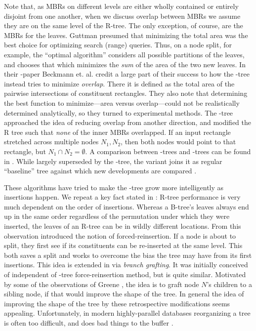 Note that, as MBRs on different levels are either wholly contained or entirely disjoint from one another, when we discuss overlap between MBRs we assume they are on the same level of the R-tree.
The only exception, of course, are the MBRs for the leaves.
Guttman \cite{guttman84} presumed that minimizing the total area was the best choice for optimizing search (range) queries.
Thus, on a node split, for example, the ``optimal algorithm'' considers all possible partitions of the leaves, and chooses that which minimizes the \emph{sum} of the area of the two new leaves.
In their \rstar-paper \cite{beckmannkriegelschneiderseeger90} Beckmann et. al. credit a large part of their success to how the \rstar-tree instead tries to minimize \emph{overlap}.
There it is defined as the total area of the pairwise intersections of constituent rectangles.
They also note that determining the best function to minimize---area versus overlap---could not be realistically determined analytically, so they turned to experimental methods.
The \rplus-tree \cite{sellisroussopoulosfaloutsos87} approached the idea of reducing overlap from another direction, and modified the R tree such that \emph{none} of the inner MBRs overlapped.
If an input rectangle stretched across multiple nodes $N_1,N_2$, then both nodes would point to that rectangle, but $N_1\cap N_2=\emptyset$.
A comparison between \rbase-trees and \rplus-trees can be found in \cite{greene89}.
While largely superseded by the \rstar-tree, the \rplus variant joins it as regular ``baseline'' tree against which new developments are compared \cite{something}.

These algorithms have tried to make the \rbase-tree grow more intelligently as insertions happen.
We repeat a key fact stated in \cite{beckmannkriegelschneiderseeger90}: R-tree performance is very much dependent on the order of insertions.
Whereas a B-tree's leaves always end up in the same order regardless of the permutation under which they were inserted, the leaves of an R-tree can be in wildly different locations.
From this observation \cite{beckmannkriegelschneiderseeger90} introduced the notion of forced-reinsertion.
If a node is about to split, they first see if its constituents can be re-inserted at the same level.
This both saves a split and works to overcome the bias the tree may have from its first insertions.
This idea is extended in \cite{schrekchen00} via \emph{branch grafting}.
It was initially conceived of independent of \rstar-tree force-reinsertion method, but is quite similar.
Motivated by some of the observations of Greene \cite{greene89}, the idea is to graft node $N$'s children to a sibling node, if that would improve the shape of the tree.
In general the idea of improving the shape of the tree by these retrospective modifications seems appealing.
Unfortunately, in modern highly-parallel databases reorganizing a tree is often too difficult, and does bad things to the buffer \cite{beckmannseeger09}.

